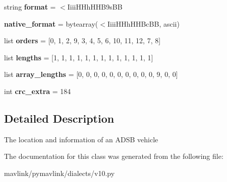 \begin{DoxyCompactItemize}
\item 
\mbox{\label{classpymavlink_1_1dialects_1_1v10_1_1MAVLink__adsb__vehicle__message_a4d1a2403227c475b4e45d43a01fda6fe}} 
string {\bfseries format} = \textquotesingle{}$<$Iiii\+H\+Hh\+H\+H\+B9s\+BB\textquotesingle{}
\item 
\mbox{\label{classpymavlink_1_1dialects_1_1v10_1_1MAVLink__adsb__vehicle__message_aa303e4fccdbfd2af676fe72217429d5b}} 
{\bfseries native\+\_\+format} = bytearray(\textquotesingle{}$<$Iiii\+H\+Hh\+H\+H\+Bc\+BB\textquotesingle{}, \textquotesingle{}ascii\textquotesingle{})
\item 
\mbox{\label{classpymavlink_1_1dialects_1_1v10_1_1MAVLink__adsb__vehicle__message_a38fb2d3f6f3bc20e2169c22760dda4cf}} 
list {\bfseries orders} = \mbox{[}0, 1, 2, 9, 3, 4, 5, 6, 10, 11, 12, 7, 8\mbox{]}
\item 
\mbox{\label{classpymavlink_1_1dialects_1_1v10_1_1MAVLink__adsb__vehicle__message_a128843cd1e9154bd17416d3f01c11b4f}} 
list {\bfseries lengths} = \mbox{[}1, 1, 1, 1, 1, 1, 1, 1, 1, 1, 1, 1, 1\mbox{]}
\item 
\mbox{\label{classpymavlink_1_1dialects_1_1v10_1_1MAVLink__adsb__vehicle__message_a11db61d200fff4c40df4bdefe1c6d438}} 
list {\bfseries array\+\_\+lengths} = \mbox{[}0, 0, 0, 0, 0, 0, 0, 0, 0, 0, 9, 0, 0\mbox{]}
\item 
\mbox{\label{classpymavlink_1_1dialects_1_1v10_1_1MAVLink__adsb__vehicle__message_a347aeb888dbb0c21f768ee8ffb24c9a7}} 
int {\bfseries crc\+\_\+extra} = 184
\end{DoxyCompactItemize}


\subsection{Detailed Description}
\begin{DoxyVerb}The location and information of an ADSB vehicle
\end{DoxyVerb}
 

The documentation for this class was generated from the following file\+:\begin{DoxyCompactItemize}
\item 
mavlink/pymavlink/dialects/v10.\+py\end{DoxyCompactItemize}
